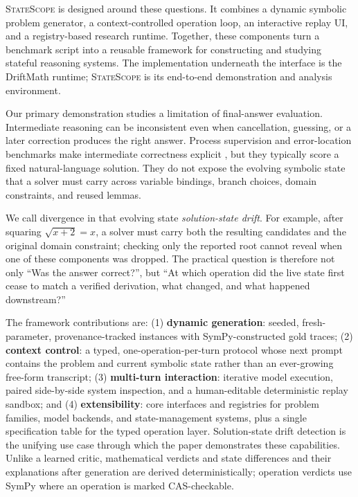 \documentclass[11pt]{article}
\newcommand{\systemname}{\textsc{StateScope}}
\begin{document}
\systemname{} is designed around these questions.  It combines a dynamic symbolic
problem generator, a context-controlled operation loop, an interactive replay UI,
and a registry-based research runtime.  Together, these components turn a benchmark
script into a reusable framework for constructing and studying stateful reasoning
systems.  The implementation underneath the interface is the DriftMath runtime;
\systemname{} is its end-to-end demonstration and analysis environment.

Our primary demonstration studies a limitation of final-answer evaluation.
Intermediate reasoning can be inconsistent even when cancellation, guessing, or a
later correction produces the right answer.  Process supervision and error-location
benchmarks make intermediate correctness explicit
\citep{lightman2023verify,zheng2025processbench}, but they typically score a fixed
natural-language solution.  They do not expose the evolving symbolic state that a
solver must carry across variable bindings, branch choices, domain constraints, and
reused lemmas.

We call divergence in that evolving state \emph{solution-state drift}.  For example,
after squaring $\sqrt{x+2}=x$, a solver must carry both the resulting candidates and
the original domain constraint; checking only the reported root cannot reveal when
one of these components was dropped.  The practical question is therefore not only
``Was the answer correct?'', but ``At which operation did the live state first cease
to match a verified derivation, what changed, and what happened downstream?''

The framework contributions are:
(1) \textbf{dynamic generation}: seeded, fresh-parameter, provenance-tracked
instances with SymPy-constructed gold traces;
(2) \textbf{context control}: a typed, one-operation-per-turn protocol whose next
prompt contains the problem and current symbolic state rather than an ever-growing
free-form transcript;
(3) \textbf{multi-turn interaction}: iterative model execution, paired side-by-side
system inspection, and a human-editable deterministic replay sandbox; and
(4) \textbf{extensibility}: core interfaces and registries for problem families,
model backends, and state-management systems, plus a single specification table for
the typed operation layer.
Solution-state drift detection is the unifying use case through which the paper
demonstrates these capabilities.  Unlike a learned critic, mathematical verdicts and
state differences and their explanations after generation are derived
deterministically; operation verdicts use SymPy where an operation is marked
CAS-checkable.
\end{document}

